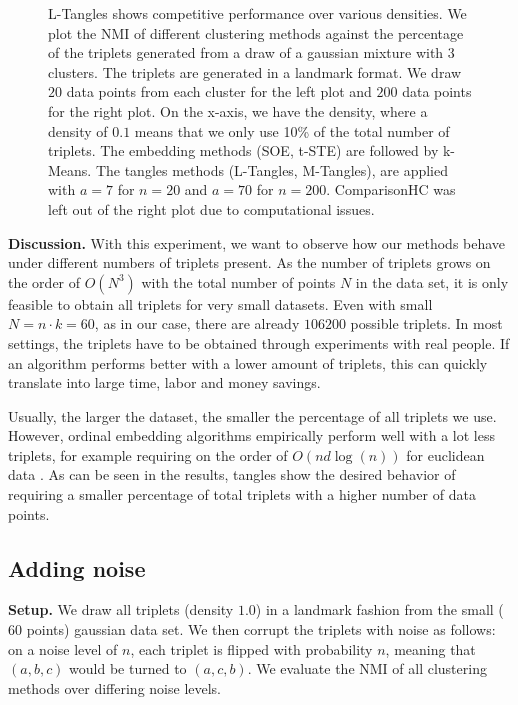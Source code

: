\begin{figure}[ht]
    \centering
    \caption{
        L-Tangles shows competitive performance over various densities. We plot the NMI of different clustering methods against the percentage of the triplets generated from 
        a draw of a gaussian mixture with $3$ clusters. The triplets are generated in a landmark format.
        We draw $20$ data points from each cluster for the left plot and $200$ data points for the right plot.
        On the x-axis, we have the density, where a density of $0.1$ means that we only use 10\% of the total number of triplets. The embedding methods (SOE, t-STE) are 
        followed by k-Means. The tangles methods (L-Tangles, M-Tangles), are applied with $a=7$ for $n=20$ and $a=70$ for $n=200$. 
        ComparisonHC was left out of the right plot due to computational issues.}
    \label{fig:density-change}
\end{figure}

\noindent
\textbf{Discussion.}
With this experiment, we want to observe how our methods behave under different numbers of triplets present. 
As the number of triplets grows on the order of $O(N^3)$ with the total number of points $N$ in the data set, it is only feasible to obtain
all triplets for very small datasets. Even with small $N = n \cdot k = 60$, as in our case, there are already $106200$ possible triplets. In most settings, the triplets have to be obtained 
through experiments with real people. If an algorithm performs better with a lower amount
of triplets, this can quickly translate into large time, labor and money savings. 

Usually, the larger the dataset, the smaller the percentage of all triplets we use.
However, ordinal embedding algorithms empirically perform well with a lot
less triplets, for example requiring on the order of $O(n d \log(n))$ for euclidean data \citep{jainFiniteSamplePrediction2016}. 
As can be seen in the results, tangles show the desired behavior of requiring a smaller percentage of total triplets with a higher number of data points.


\subsection{Adding noise}\label{sec:adding-noise}
\textbf{Setup.}
We draw all triplets (density $1.0$) in a landmark fashion from the small ($60$ points) gaussian data set. We then corrupt the triplets with noise as follows:
on a noise level of $n$, each triplet is flipped with probability $n$, meaning that $(a,b,c)$ would be turned to $(a,c,b)$.
We evaluate the NMI of all clustering methods over differing noise levels.

